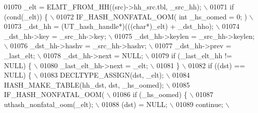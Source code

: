 \begin{DoxyCode}
{{{{{{{{{01070 \textcolor{preprocessor}{        \_elt = ELMT\_FROM\_HH((src)->hh\_src.tbl, \_src\_hh);                         \(\backslash\)}
01071 \textcolor{preprocessor}{        if (cond(\_elt)) \{                                                        \(\backslash\)}
01072 \textcolor{preprocessor}{          IF\_HASH\_NONFATAL\_OOM( int \_hs\_oomed = 0; )                             \(\backslash\)}
01073 \textcolor{preprocessor}{          \_dst\_hh = (UT\_hash\_handle*)(((char*)\_elt) + \_dst\_hho);                 \(\backslash\)}
01074 \textcolor{preprocessor}{          \_dst\_hh->key = \_src\_hh->key;                                           \(\backslash\)}
01075 \textcolor{preprocessor}{          \_dst\_hh->keylen = \_src\_hh->keylen;                                     \(\backslash\)}
01076 \textcolor{preprocessor}{          \_dst\_hh->hashv = \_src\_hh->hashv;                                       \(\backslash\)}
01077 \textcolor{preprocessor}{          \_dst\_hh->prev = \_last\_elt;                                             \(\backslash\)}
01078 \textcolor{preprocessor}{          \_dst\_hh->next = NULL;                                                  \(\backslash\)}
01079 \textcolor{preprocessor}{          if (\_last\_elt\_hh != NULL) \{                                            \(\backslash\)}
01080 \textcolor{preprocessor}{            \_last\_elt\_hh->next = \_elt;                                           \(\backslash\)}
01081 \textcolor{preprocessor}{          \}                                                                      \(\backslash\)}
01082 \textcolor{preprocessor}{          if ((dst) == NULL) \{                                                   \(\backslash\)}
01083 \textcolor{preprocessor}{            DECLTYPE\_ASSIGN(dst, \_elt);                                          \(\backslash\)}
01084 \textcolor{preprocessor}{            HASH\_MAKE\_TABLE(hh\_dst, dst, \_hs\_oomed);                             \(\backslash\)}
01085 \textcolor{preprocessor}{            IF\_HASH\_NONFATAL\_OOM(                                                \(\backslash\)}
01086 \textcolor{preprocessor}{              if (\_hs\_oomed) \{                                                   \(\backslash\)}
01087 \textcolor{preprocessor}{                uthash\_nonfatal\_oom(\_elt);                                       \(\backslash\)}
01088 \textcolor{preprocessor}{                (dst) = NULL;                                                    \(\backslash\)}
01089 \textcolor{preprocessor}{                continue;                                                        \(\backslash\)}
}}}}}}}}}
\end{DoxyCode}
